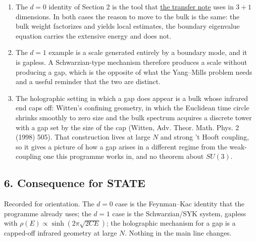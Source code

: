 \documentclass[11pt,a4paper]{article}
\newcommand{\tightlist}{\setlength{\itemsep}{0pt}\setlength{\parskip}{0pt}}
\begin{document}
\begin{enumerate}
\def\labelenumi{\arabic{enumi}.}
\tightlist
\item
  The \(d=0\) identity of Section 2 is the tool that
  \href{ground-state-measure-transfer.md}{the transfer note} uses in
  \(3+1\) dimensions. In both cases the reason to move to the bulk is
  the same: the bulk weight factorizes and yields local estimates, the
  boundary eigenvalue equation carries the extensive energy and does
  not.
\item
  The \(d=1\) example is a scale generated entirely by a boundary mode,
  and it is gapless. A Schwarzian-type mechanism therefore produces a
  scale without producing a gap, which is the opposite of what the
  Yang--Mills problem needs and a useful reminder that the two are
  distinct.
\item
  The holographic setting in which a gap does appear is a bulk whose
  infrared end caps off: Witten's confining geometry, in which the
  Euclidean time circle shrinks smoothly to zero size and the bulk
  spectrum acquires a discrete tower with a gap set by the size of the
  cap (Witten, Adv. Theor. Math. Phys. 2 (1998) 505). That construction
  lives at large \(N\) and strong 't Hooft coupling, so it gives a
  picture of how a gap arises in a different regime from the
  weak-coupling one this programme works in, and no theorem about
  \(SU(3)\).
\end{enumerate}

\hypertarget{consequence-for-state}{%
\subsection{6. Consequence for STATE}\label{consequence-for-state}}

Recorded for orientation. The \(d=0\) case is the Feynman--Kac identity
that the programme already uses; the \(d=1\) case is the Schwarzian/SYK
system, gapless with \(\rho(E)\propto\sinh(2\pi\sqrt{2CE})\); the
holographic mechanism for a gap is a capped-off infrared geometry at
large \(N\). Nothing in the main line changes.
\end{document}
